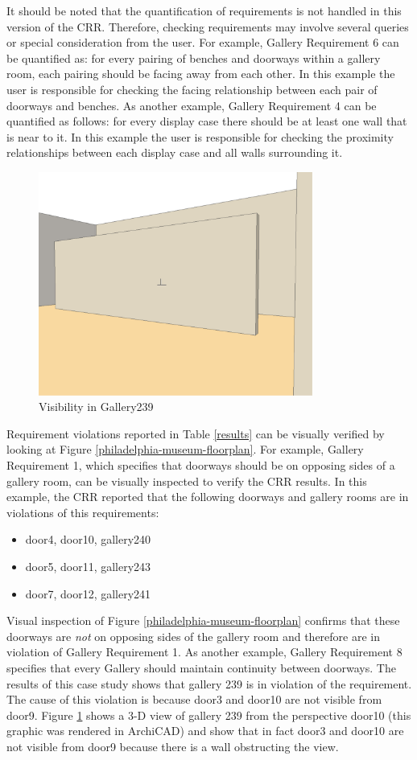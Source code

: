 \documentclass[12pt]{ucthesis}
\begin{document}
It should be noted that the quantification of requirements is not handled in this version of the CRR. Therefore, checking requirements may involve several queries or special consideration from the user. For example, Gallery Requirement 6 can be quantified as: for every pairing of benches and doorways within a gallery room, each pairing should be facing away from each other. In this example the user is responsible for checking the facing relationship between each pair of doorways and benches. As another example, Gallery Requirement 4 can be quantified as follows: for every display case there should be at least one wall that is near to it. In this example the user is responsible for checking the proximity relationships between each display case and all walls surrounding it. 

\begin{figure}[t]
\centering
\includegraphics[width=90mm]{coninuity-req-view}
\caption{Visibility in Gallery239}
\label{continuity-gallery239}
\end{figure}

Requirement violations reported in Table \ref{results} can be visually verified by looking at Figure \ref{philadelphia-museum-floorplan}. For example, Gallery Requirement 1, which specifies that doorways should be on opposing sides of a gallery room, can be visually inspected to verify the CRR results. In this example, the CRR reported that the following doorways and gallery rooms are in violations of this requirements:
\begin{itemize}
\item door4, door10, gallery240
\item door5, door11, gallery243
\item door7, door12, gallery241
\end{itemize} Visual inspection of Figure \ref{philadelphia-museum-floorplan} confirms that these doorways are \emph{not} on opposing sides of the gallery room and therefore are in violation of Gallery Requirement 1. As another example, Gallery Requirement 8 specifies that every Gallery should maintain continuity between doorways. The results of this case study shows that gallery 239 is in violation of the requirement. The cause of this violation is because door3 and door10 are not visible from door9. Figure \ref{continuity-gallery239} shows a 3-D view of gallery 239 from the perspective door10 (this graphic was rendered in ArchiCAD) and show that in fact door3 and door10 are not visible from door9 because there is a wall obstructing the view.
\end{document}
